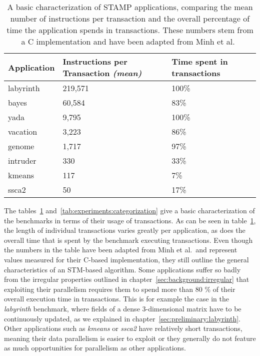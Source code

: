 \begin{table}
    \centering
    \begin{tabular}{|l|l|l|}
        \hline
        \textbf{Application} & \textbf{Instructions per Transaction} \emph{(mean)} & \textbf{Time spent in transactions}\\\hline\hline
        labyrinth & 219,571 & 100\%\\\hline
        bayes & 60,584 & 83\%\\\hline
        yada & 9,795 & 100\%\\\hline
        vacation & 3,223 & 86\%\\\hline
        genome & 1,717 & 97\%\\\hline
        intruder & 330 & 33\%\\\hline
        kmeans & 117 & 7\%\\\hline
        ssca2 & 50 & 17\%\\\hline
    \end{tabular}
    \caption{A basic characterization of STAMP applications, comparing the mean number of instructions per transaction and the overall percentage of time the application spends in transactions. These numbers stem from a C implementation and have been adapted from Minh et al.~\cite{minh2008stamp}}
    \label{tab:experiments:overview}
\end{table}

The tables~\ref{tab:experiments:overview} and~\ref{tab:experiments:categorization} give a basic characterization of the benchmarks in terms of their usage of transactions.
As can be seen in table~\ref{tab:experiments:overview}, the length of individual transactions varies greatly per application, as does the overall time that is spent by the benchmark executing transactions.
Even though the numbers in the table have been adapted from Minh et al.\ and represent values measured for their C-based implementation, they still outline the general characteristics of an STM-based algorithm.
Some applications suffer so badly from the irregular properties outlined in chapter~\ref{sec:background:irregular} that exploiting their parallelism requires them to spend more than 80 \% of their overall execution time in transactions.
This is for example the case in the \emph{labyrinth} benchmark, where fields of a dense 3-dimensional matrix have to be continuously updated, as we explained in chapter~\ref{sec:preliminary:labyrinth}.
Other applications such as \emph{kmeans} or \emph{ssca2} have relatively short transactions, meaning their data parallelism is easier to exploit or they generally do not feature as much opportunities for parallelism as other applications.

